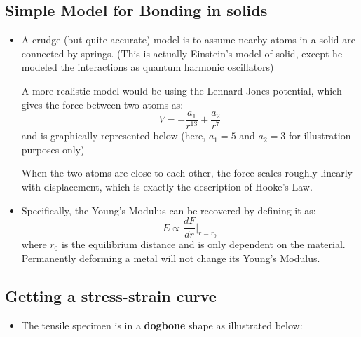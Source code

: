 \subsection{Simple Model for Bonding in solids}
\begin{itemize}
    \item A crudge (but quite accurate) model is to assume nearby atoms in a solid are connected by springs. (This is actually Einstein's model of solid, except he modeled the interactions as quantum harmonic oscillators)
    \begin{idea}
        A more realistic model would be using the Lennard-Jones potential, which gives the force between two atoms as:
        \begin{equation}
            V = -\frac{a_1}{r^{13}}+\frac{a_2}{r^7}
        \end{equation}
        and is graphically represented below (here, $a_1=5$ and $a_2=3$ for illustration purposes only)
        \begin{center}
        \end{center}
    \end{idea}
    When the two atoms are close to each other, the force scales roughly linearly with displacement, which is exactly the description of Hooke's Law.
    \item Specifically, the Young's Modulus can be recovered by defining it as:
    \begin{equation}
        E \propto \frac{dF}{dr} \Big|_{r=r_0}
    \end{equation}
    where $r_0$ is the equilibrium distance and is only dependent on the material. Permanently deforming a metal will not change its Young's Modulus.
\end{itemize}
\subsection{Getting a stress-strain curve}
\begin{itemize}
    \item The tensile specimen is in a \textbf{dogbone} shape as illustrated below:
    \begin{figure}[ht]
        \centering
    \end{figure}
\end{itemize}
